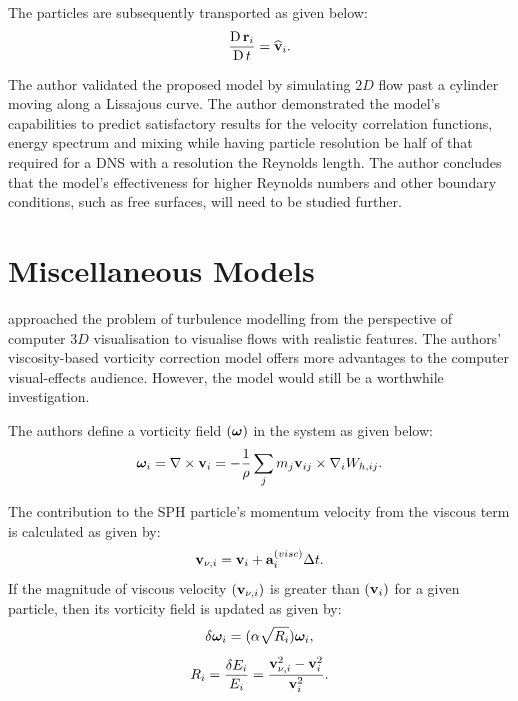 The particles are subsequently transported as given below:
\begin{equation}
    \frac{\operatorname{D} \mathbf{r}_i}{\operatorname{D} t} = \widehat{\mathbf{v}}_i.
    \label{eq:Monaghan2017-r-transport}
\end{equation}

The author validated the proposed model by simulating $2D$ flow past a cylinder moving along a Lissajous curve.
The author demonstrated the model’s capabilities to predict satisfactory results for the velocity correlation functions, energy spectrum and mixing while having particle resolution be half of that required for a DNS with a resolution the Reynolds length. The author concludes that the model’s effectiveness for higher Reynolds numbers and other boundary conditions, such as free surfaces, will need to be studied further.

\section{Miscellaneous Models}
\cite{Liu2019} approached the problem of turbulence modelling from the perspective of computer $3D$ visualisation to visualise flows with realistic features. The authors’ viscosity-based vorticity correction model offers more advantages to the computer visual-effects audience. However, the model would still be a worthwhile investigation.

The authors define a vorticity field $(\bm{\omega})$ in the system as given below:
\begin{equation}
    \bm{\omega}_i = \nabla \times \mathbf{v}_i = - \frac{1}{\rho} \sum_j m_j \mathbf{v}_{ij} \times \nabla_{i} W_{h, ij}.
    \label{eq:Liu2019-vorticity}
\end{equation}

The contribution to the SPH particle’s momentum velocity from the viscous term is calculated as given by:
\begin{equation}
    \mathbf{v}_{\nu, i} = \mathbf{v}_i + \mathbf{a}_i^{(visc)}\Delta t.
    \label{eq:Liu2019-visc-vel-contribution}
\end{equation}
If the magnitude of viscous velocity $(\mathbf{v}_{\nu, i})$ is greater than $(\mathbf{v}_i)$ for a given particle, then its vorticity field is updated as given by:
\begin{equation}
    \delta \bm{\omega}_i = (\alpha \sqrt{R_i}) \bm{\omega}_i,
    \label{eq:Liu2019-vorticity-update}
\end{equation}
\begin{equation}
    R_i = \frac{\delta E_i}{E_i} = \frac{\mathbf{v}_{\nu, i}^2 - \mathbf{v}_i^2}{\mathbf{v}_i^2}.
    \label{eg:Liu2019-R}
\end{equation}

